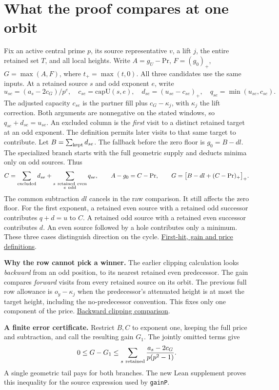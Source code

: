 \documentclass[12pt,letterpaper]{article}
\newcommand{\orig}[3]{\href{https://github.com/nousentllc/riemann-hypothesis/blob/40e56bab026552e089d7afcfeff08d2defb9c005/src/#1.lean\#L#2}{#3}}
\newcommand{\para}[1]{\par\medskip\noindent\textbf{#1}\quad}
\newcommand{\pagepart}[1]{\clearpage\section{#1}}
\begin{document}
\pagepart{What the proof compares at one orbit}
Fix an active central prime \(p\), its source representative \(v\), a lift \(j\), the entire retained set \(T\), and all local heights. Write \(A=g_U-\mathrm{Pr}\), \(F=(g_0)_+\), \(G=\max(A,F)\), where \(t_+=\max(t,0)\). All three candidates use the same inputs. At a retained source \(s\) and odd exponent \(e\), write
\[
 u_{se}=(a_s-2c_G)/p^e,\quad c_{se}=\mathrm{capU}(s,e),\quad
 d_{se}=(u_{se}-c_{se})_+,\quad q_{se}=\min(u_{se},c_{se}).
\]
The adjusted capacity \(c_{se}\) is the partner fill plus \(c_G-\kappa_j\), with \(\kappa_j\) the lift correction. Both arguments are nonnegative on the stated windows, so \(q_{se}+d_{se}=u_{se}\). An excluded column is the \emph{first} visit to a distinct retained target at an odd exponent. The definition permits later visits to that same target to contribute. Let \(B=\sum_{\rm kept}d_{se}\). The fallback before the zero floor is \(g_0=B-dl\). The specialized branch starts with the full geometric supply and deducts minima only on odd sources. Thus
\[
 C=\sum_{\rm excluded}d_{se}+
       \sum_{\substack{s\ {\rm retained\ even}\\e\ {\rm odd}}}q_{se},
 \qquad A-g_0=C-\mathrm{Pr},\qquad
 G=\big[B-dl+(C-\mathrm{Pr})_+\big]_+ .
\]
The common subtraction \(dl\) cancels in the raw comparison. It still affects the zero floor. For the first exponent, a retained even source with a retained odd successor contributes \(q+d=u\) to \(C\). A retained odd source with a retained even successor contributes \(d\). An even source followed by a hole contributes only a minimum. These three cases distinguish direction on the cycle. \orig{Formalism/SharpRestriction/GrowthBounds/IsResidueClassZero}{234}{First-hit, gain and price definitions}.

\para{Why the row cannot pick a winner.} The earlier clipping calculation looks \emph{backward} from an odd position, to its nearest retained even predecessor. The gain compares \emph{forward} visits from every retained source on its orbit. The previous full row allowance is \(o_y-\kappa_j\) when the predecessor's attenuated height is at most the target height, including the no-predecessor convention. This fixes only one component of the price. \orig{Formalism/SharpRestriction/GrowthBounds/LogarithmicSums/PartnerCountOfCentral}{399}{Backward clipping comparison}.

\para{A finite error certificate.} Restrict \(B,C\) to exponent one, keeping the full price and subtraction, and call the resulting gain \(G_1\). The jointly omitted terms give
\[
 0\le G-G_1\le\sum_{s\ {\rm retained}}\frac{a_s-2c_G}{p(p^2-1)} .
\]
A single geometric tail pays for both branches. The new Lean supplement proves this inequality for the source expression used by \texttt{gainP}.
\end{document}
